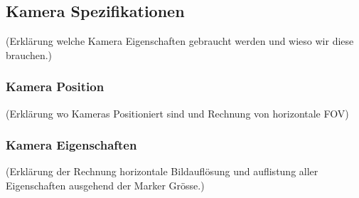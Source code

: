 \subsection{Kamera Spezifikationen}
(Erklärung welche Kamera Eigenschaften gebraucht werden und wieso wir diese brauchen.)
\subsubsection{Kamera Position}
(Erklärung wo Kameras Positioniert sind und Rechnung von horizontale FOV)
\subsubsection{Kamera Eigenschaften}
(Erklärung der Rechnung horizontale Bildauflösung und auflistung aller Eigenschaften ausgehend der Marker Grösse.)

